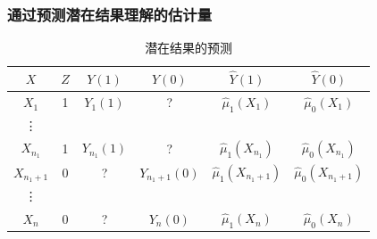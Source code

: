 \subsubsection{通过预测潜在结果理解\citet{lin2013}的估计量}
\label{sec::understand-lin-predict}
 
\begin{table}
\centering
\caption{潜在结果的预测}\label{tb::predict-po-ols}
\begin{tabular}{cccccc}
\hline 
$X$ & $Z$ & $Y(1)$ & $Y(0)$ &  $\hat{Y}(1)$ & $\hat{Y}(0)$ \\
\hline
$X_1 $ & 1 & $Y_1(1)$ & ? & $\hat{\mu}_1(X_1 )$ & $\hat{\mu}_0(X_1)$ \\
\vdots \\
$X_{n_1}$ & 1 & $Y_{n_1}(1)$ & ? & $\hat{\mu}_1(X_{n_1})$ & $\hat{\mu}_0(X_{n_1})$ \\
$X_{n_1 + 1}$ & 0 & ? & $Y_{n_1+1}(0)$ & $\hat{\mu}_1(X_{n_1+1})$ & $\hat{\mu}_0(X_{n_1+1})$ \\
\vdots \\
$X_{n}$ & 0 & ? & $Y_{n}(0)$ & $\hat{\mu}_1(X_{n})$ & $\hat{\mu}_0(X_{n})$ \\
\hline 
\end{tabular}
\end{table}


